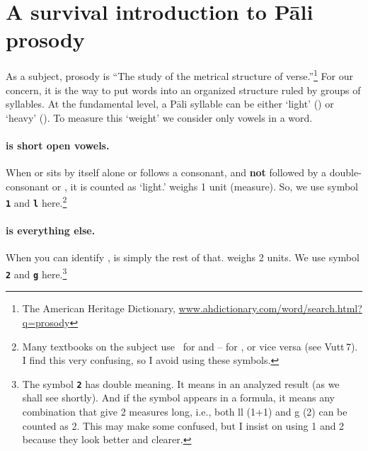 \section{A survival introduction to Pāli prosody}

As a subject, prosody is ``The study of the metrical structure of verse.''\footnote{The American Heritage Dictionary, \url{www.ahdictionary.com/word/search.html?q=prosody}} For our concern, it is the way to put words into an organized structure ruled by groups of syllables. At the fundamental level, a Pāli syllable can be either `light' () or `heavy' (). To measure this `weight' we consider only vowels in a word.

\paragraph{ is short open vowels.} When  or  sits by itself alone or follows a consonant, and \textbf{not} followed by a double-consonant or , it is counted as `light.'  weighs 1 unit (measure). So, we use symbol \texttt{\bfseries 1} and \texttt{\bfseries l} here.\footnote{Many textbooks on the subject use \smallsmile\ for  and -- for , or vice versa (see Vutt\,7). I find this very confusing, so I avoid using these symbols.} 

\paragraph{ is everything else.} When you can identify ,  is simply the rest of that.  weighs 2 units. We use symbol \texttt{\bfseries 2} and \texttt{\bfseries g} here.\footnote{The symbol \texttt{\bfseries 2} has double meaning. It means  in an analyzed result (as we shall see shortly). And if the symbol appears in a formula, it means any combination that give 2 measures long, i.e., both ll (1+1) and g (2) can be counted as 2. This may make some confused, but I insist on using 1 and 2 because they look better and clearer.}


